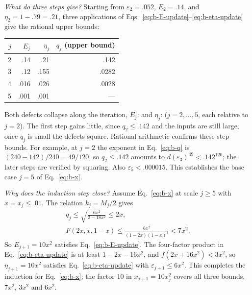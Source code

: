 \documentclass[aps,prl,reprint,amsmath,amssymb,nofootinbib,raggedbottom]{revtex4-2}
\begin{document}
\emph{What do three steps give?} Starting from $\varepsilon_2=.052$,
$E_2=.14$, and $\eta_2=1-.79=.21$, three applications of
Eqs.~\eqref{eq:b-E-update}--\eqref{eq:b-eta-update} give the rational upper
bounds:
\begin{center}
\begin{tabular}{@{}rrrr@{}}
\toprule
$j$ & $E_j$ & $\eta_j$ & $q_j$ (upper bound)\\
\midrule
2 & .14 & .21 & .142\\
3 & .12 & .155 & .0282\\
4 & .016 & .026 & .0028\\
5 & .001 & .001 & ---\\
\bottomrule
\end{tabular}
\end{center}
Both defects collapse along the iteration, $E_j$:
 and $\eta_j$: 
($j=2,\dots,5$, each relative to $j=2$). The first step gains little, since
$q_2\le.142$ and the inputs are still large; once $q_j$ is small the defects
square.
Rational arithmetic confirms these step bounds. For example, at $j=2$ the
exponent in Eq.~\eqref{eq:b-q} is $(240-142)/240=49/120$, so $q_2\le.142$
amounts to $d(\varepsilon_3)^{49}<.142^{120}$; the later steps are verified by
squaring. Also $\varepsilon_5<.000015$. This establishes the base case $j=5$
of Eq.~\eqref{eq:b-x}.

\emph{Why does the induction step close?} Assume Eq.~\eqref{eq:b-x} at scale
$j\ge5$ with $x=x_j\le.01$. The relation $k_j=M_j/2$ gives
\begin{equation}
 \begin{gathered}
 q_j\le\sqrt{\frac{6x^2}{2-18x^2}}\le2x,\\
 F(2x,x,1-x)\le\frac{6x^2}{(1-2x)(1-x)^3}<7x^2.
 \end{gathered}
 \label{eq:b-x-e}
\end{equation}
So $E_{j+1}=10x^2$ satisfies Eq.~\eqref{eq:b-E-update}. The four-factor product
in Eq.~\eqref{eq:b-eta-update} is at least $1-2x-16x^2$, and
$f(2x+16x^2)<3x^2$, so $\eta_{j+1}=10x^2$ satisfies
Eq.~\eqref{eq:b-eta-update} with $\varepsilon_{j+1}\le6x^2$. This completes the
induction for Eq.~\eqref{eq:b-x}; the factor $10$ in $x_{j+1}=10x_j^2$ covers all
three bounds, $7x^2$, $3x^2$ and $6x^2$.
\end{document}
